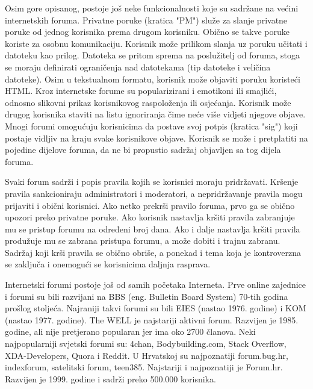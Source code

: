 \documentclass{foi}
\begin{document}
Osim gore opisanog, postoje još neke funkcionalnosti koje su sadržane na većini internetskih foruma. Privatne poruke (kratica "PM") služe za slanje privatne poruke od jednog korisnika prema drugom korisniku. Obično se takve poruke koriste za osobnu komunikaciju. Korisnik može prilikom slanja uz poruku učitati i datoteku kao prilog. Datoteka se pritom sprema na poslužitelj od foruma, stoga se moraju definirati ograničenja nad datotekama (tip datoteke i veličina datoteke). Osim u tekstualnom formatu, korisnik može objaviti poruku koristeći HTML. Kroz internetske forume su popularizirani i emotikoni ili smajlići, odnosno slikovni prikaz korisnikovog raspoloženja ili osjećanja. Korisnik može drugog korisnika staviti na listu ignoriranja čime neće više vidjeti njegove objave. Mnogi forumi omogućuju korisnicima da postave svoj potpis (kratica "sig") koji postaje vidljiv na kraju svake korisnikove objave. Korisnik se može i pretplatiti na pojedine dijelove foruma, da ne bi propustio sadržaj objavljen sa tog dijela foruma.\cite{vbulletinhelp}

Svaki forum sadrži i popis pravila kojih se korisnici moraju pridržavati. Kršenje pravila sankcioniraju administratori i moderatori, a nepridržavanje pravila mogu prijaviti i obični korisnici. Ako netko prekrši pravilo foruma, prvo ga se obično upozori preko privatne poruke. Ako korisnik nastavlja kršiti pravila zabranjuje mu se pristup forumu na određeni broj dana. Ako i dalje nastavlja kršiti pravila produžuje mu se zabrana pristupa forumu, a može dobiti i trajnu zabranu. Sadržaj koji krši pravila se obično obriše, a ponekad i tema koja je kontroverzna se zaključa i onemogući se korisnicima daljnja rasprava. \cite{rules}

Internetski forumi postoje još od samih početaka Interneta. Prve online zajednice i forumi su bili razvijani na BBS (eng. Bulletin Board System) 70-tih godina prošlog stoljeća. Najraniji takvi forumi su bili EIES (nastao 1976. godine) i KOM (nastao 1977. godine). The WELL je najstariji aktivni forum. Razvijen je 1985. godine, ali nije pretjerano popularan jer ima oko 2700 članova. \cite{forumhistory} Neki najpopularniji svjetski forumi su: 4chan, Bodybuilding.com, Stack Overflow, XDA-Developers, Quora i Reddit. U Hrvatskoj su najpoznatiji forum.bug.hr, indexforum, satelitski forum, teen385. Najstariji i najpoznatiji je Forum.hr. Razvijen je 1999. godine i sadrži preko 500.000 korisnika.
\end{document}
